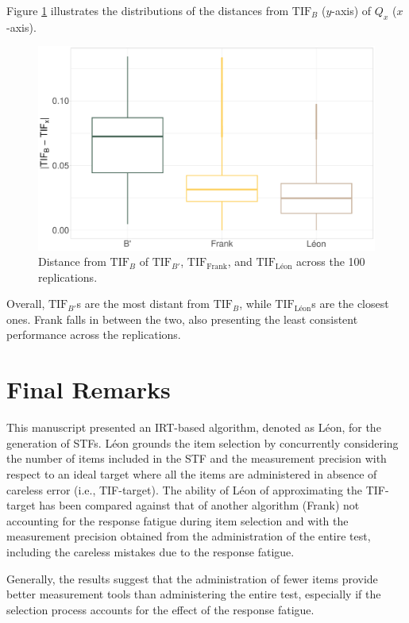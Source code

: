 \documentclass{svproc}
\begin{document}
Figure \ref{fig:points-alogirthms} illustrates the distributions of the distances from $\text{TIF}_B$ ($y$-axis) of $Q_x$ ($x$-axis).

\begin{figure}[!h]
	\centering
	\includegraphics[width=\linewidth]{img/box-plot-alogirthms}
	\caption{Distance from $\text{TIF}_{B}$ of $\text{TIF}_{B'}$, $\text{TIF}_{\text{Frank}}$, and $\text{TIF}_{\text{Léon}}$  across the 100 replications.} 
	\label{fig:points-alogirthms}
\end{figure}

Overall, $\text{TIF}_{B'}$s are the most distant from $\text{TIF}_B$, while $\text{TIF}_{\text{Léon}}$s are the closest ones. Frank falls in between the two, also presenting the least consistent performance across the replications. 

\section{Final Remarks}

This manuscript presented an IRT-based algorithm, denoted as Léon, for the generation of  STFs. 
Léon grounds the item selection by concurrently considering the number of items included in the STF and the measurement precision with respect to an ideal target where all the items are administered in absence of careless error (i.e., TIF-target). The ability of Léon of approximating the TIF-target has been compared against that of another algorithm (Frank) not accounting for the response fatigue during item selection and with the measurement precision obtained from the administration of the entire test, including the careless mistakes due to the response fatigue.
 

Generally, the results suggest that the administration of fewer items provide better measurement tools than administering the entire test, especially if the selection process accounts for the effect of the response fatigue.
\end{document}
